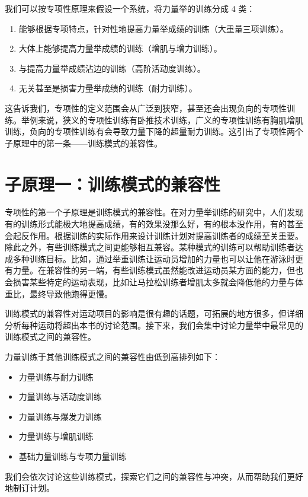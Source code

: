 \documentclass[fontset=fandol, a4paper, 12pt, openright]{ctexbook}
\begin{document}
我们可以按专项性原理来假设一个系统，将力量举的训练分成 4 类：
\begin{enumerate}
    \item 能够根据专项特点，针对性地提高力量举成绩的训练（大重量三项训练）。
    \item 大体上能够提高力量举成绩的训练（增肌与增力训练）。
    \item 与提高力量举成绩沾边的训练（高阶活动度训练）。
    \item 无关甚至是损害力量举成绩的训练（耐力训练）。
\end{enumerate}

这告诉我们，专项性的定义范围会从广泛到狭窄，甚至还会出现负向的专项性训练。举例来说，狭义的专项性训练有卧推技术训练，广义的专项性训练有胸肌增肌训练，负向的专项性训练有会导致力量下降的超量耐力训练。这引出了专项性两个子原理中的第一条——训练模式的兼容性。

\section{子原理一：训练模式的兼容性}

专项性的第一个子原理是训练模式的兼容性。在对力量举训练的研究中，人们发现有的训练形式能极大地提高成绩，有的效果没那么好，有的根本没作用，有的甚至会起反作用。根据训练的实际作用来设计训练计划对提高训练者的成绩至关重要。除此之外，有些训练模式之间更能够相互兼容。某种模式的训练可以帮助训练者达成多种训练目标。比如，通过举重训练让运动员增加的力量也可以让他在游泳时更有力量。在兼容性的另一端，有些训练模式虽然能改进运动员某方面的能力，但也会损害某些特定的运动表现，比如让马拉松训练者增肌太多就会降低他的力量与体重比，最终导致他跑得更慢。

训练模式的兼容性对运动项目的影响是很有趣的话题，可拓展的地方很多，但详细分析每种运动将超出本书的讨论范围。接下来，我们会集中讨论力量举中最常见的训练模式之间的兼容性。

力量训练于其他训练模式之间的兼容性由低到高排列如下：
\begin{itemize}
    \item 力量训练与耐力训练
    \item 力量训练与活动度训练
    \item 力量训练与爆发力训练
    \item 力量训练与增肌训练
    \item 基础力量训练与专项力量训练
\end{itemize}

我们会依次讨论这些训练模式，探索它们之间的兼容性与冲突，从而帮助我们更好地制订计划。
\end{document}
